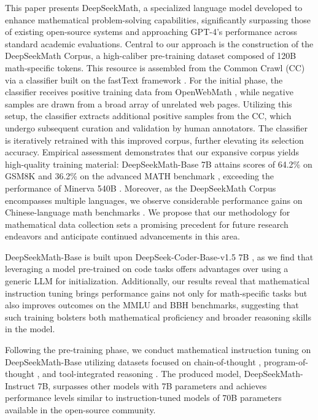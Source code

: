 This paper presents DeepSeekMath, a specialized language model developed to enhance mathematical problem-solving capabilities, significantly surpassing those of existing open-source systems and approaching GPT-4’s performance across standard academic evaluations. Central to our approach is the construction of the DeepSeekMath Corpus, a high-caliber pre-training dataset composed of 120B math-specific tokens. This resource is assembled from the Common Crawl (CC) via a classifier built on the fastText framework \citep{joulin2016fasttext}. For the initial phase, the classifier receives positive training data from OpenWebMath \citep{openwebmath}, while negative samples are drawn from a broad array of unrelated web pages. Utilizing this setup, the classifier extracts additional positive samples from the CC, which undergo subsequent curation and validation by human annotators. The classifier is iteratively retrained with this improved corpus, further elevating its selection accuracy. Empirical assessment demonstrates that our expansive corpus yields high-quality training material: DeepSeekMath-Base 7B attains scores of 64.2\% on GSM8K \citep{gsm8k} and 36.2\% on the advanced MATH benchmark \citep{MATH}, exceeding the performance of Minerva 540B \citep{minerva}. Moreover, as the DeepSeekMath Corpus encompasses multiple languages, we observe considerable performance gains on Chinese-language math benchmarks \citep{wei2023cmath,agieval}. We propose that our methodology for mathematical data collection sets a promising precedent for future research endeavors and anticipate continued advancements in this area.

DeepSeekMath-Base is built upon DeepSeek-Coder-Base-v1.5 7B \citep{deepseek-coder}, as we find that leveraging a model pre-trained on code tasks offers advantages over using a generic LLM for initialization. Additionally, our results reveal that mathematical instruction tuning brings performance gains not only for math-specific tasks but also improves outcomes on the MMLU \citep{mmlu} and BBH \citep{bbh} benchmarks, suggesting that such training bolsters both mathematical proficiency and broader reasoning skills in the model.

Following the pre-training phase, we conduct mathematical instruction tuning on DeepSeekMath-Base utilizing datasets focused on chain-of-thought \citep{cot}, program-of-thought \citep{pot,pal}, and tool-integrated reasoning \citep{tora}. The produced model, DeepSeekMath-Instruct 7B, surpasses other models with 7B parameters and achieves performance levels similar to instruction-tuned models of 70B parameters available in the open-source community.

